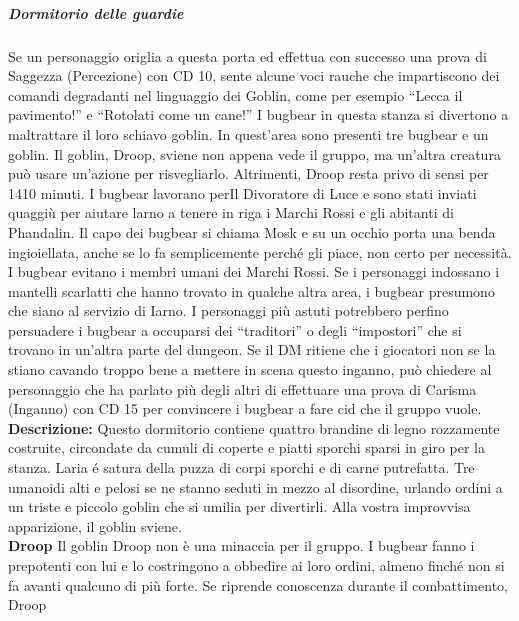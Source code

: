 \documentclass{article}
\begin{document}
        \subparagraph{Dormitorio delle guardie} Se un personaggio origlia a questa porta ed effettua con
        successo una prova di Saggezza (Percezione) con CD 10,
        sente alcune voci rauche che impartiscono dei comandi
        degradanti nel linguaggio dei Goblin, come per esempio
        “Lecca il pavimento!” e “Rotolati come un cane!” I bugbear in
        questa stanza si divertono a maltrattare il loro schiavo goblin.
        In quest'area sono presenti tre bugbear e un goblin. Il
        goblin, Droop, sviene non appena vede il gruppo, ma un’altra
        creatura può usare un’azione per risvegliarlo. Altrimenti,
        Droop resta privo di sensi per 1410 minuti.
        I bugbear lavorano perIl Divoratore di Luce e sono stati inviati
        quaggiù per aiutare larno a tenere in riga i Marchi Rossi e
        gli abitanti di Phandalin. Il capo dei bugbear si chiama Mosk
        e su un occhio porta una benda ingioiellata, anche se lo fa
        semplicemente perché gli piace, non certo per necessità.
        I bugbear evitano i membri umani dei Marchi Rossi. Se i
        personaggi indossano i mantelli scarlatti che hanno trovato
        in qualche altra area, i bugbear presumono che siano al
        servizio di Iarno. I personaggi più astuti potrebbero perfino
        persuadere i bugbear a occuparsi dei “traditori” o degli
        “impostori” che si trovano in un’altra parte del dungeon. Se
        il DM ritiene che i giocatori non se la stiano cavando troppo
        bene a mettere in scena questo inganno, può chiedere al
        personaggio che ha parlato più degli altri di effettuare una
        prova di Carisma (Inganno) con CD 15 per convincere i
        bugbear a fare cid che il gruppo vuole. \\
        \textbf{Descrizione: } Questo dormitorio contiene quattro brandine di legno
        rozzamente costruite, circondate da cumuli di coperte e
        piatti sporchi sparsi in giro per la stanza. Laria é satura della
        puzza di corpi sporchi e di carne putrefatta. Tre umanoidi alti
        e pelosi se ne stanno seduti in mezzo al disordine, urlando
        ordini a un triste e piccolo goblin che si umilia per divertirli.
        Alla vostra improvvisa apparizione, il goblin sviene.\\
        \textbf{Droop} Il goblin Droop non è una minaccia per il gruppo. I bugbear
        fanno i prepotenti con lui e lo costringono a obbedire ai loro
        ordini, almeno finché non si fa avanti qualcuno di più forte.
        Se riprende conoscenza durante il combattimento, Droop
\end{document}
